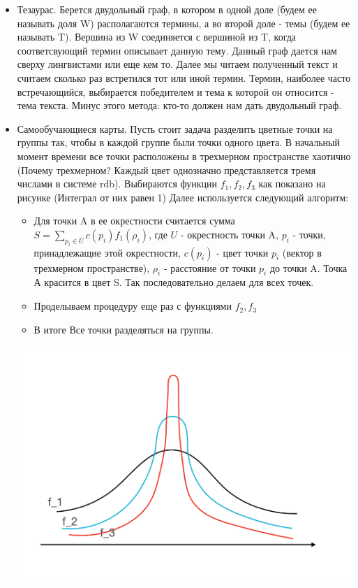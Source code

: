 \begin {itemize}
\item Тезаурас. Берется двудольный граф, в котором в одной доле (будем ее называть доля  W) располагаются термины, а во второй доле - темы (будем ее называть T). Вершина из W соединяется с вершиной из T, когда соответсвующий термин описывает данную тему. Данный граф дается нам сверху лингвистами или еще кем то. Далее мы читаем полученный текст и считаем сколько раз встретился тот или иной термин. Термин, наиболее часто встречающийся, выбирается победителем и тема к которой он относится - тема текста. Минус этого метода: кто-то должен нам дать двудольный граф.
\item Самообучающиеся карты.
Пусть стоит задача разделить цветные точки на группы так, чтобы в каждой группе были точки одного цвета. В начальный момент времени все точки расположены в трехмерном пространстве хаотично (Почему трехмерном? Каждый цвет однозначно представляется тремя числами в системе rdb). Выбираются функции $f_1, f_2, f_3$ как показано на рисунке (Интеграл от них равен 1)
Далее используется следующий алгоритм:
\begin {itemize}
\item Для точки A в ее окрестности считается сумма $S = \sum_{p_i \in U} c (p_i) f_1 (\rho_i)$, где $U$ - окрестность точки A, $p_i$ - точки, принадлежащие этой окрестности, $c (p_i)$ - цвет точки $p_i$ (вектор в трехмерном пространстве), $\rho_i$ - расстояние от точки $p_i$ до точки A. Точка А красится в цвет S. Так последовательно делаем для всех точек.
\item Проделываем процедуру еще раз с функциями $f_2, f_3$
\item В итоге Все точки разделяться на группы.
\end {itemize}

\includegraphics[width=0.5\linewidth]{13/func}


\end{itemize}
